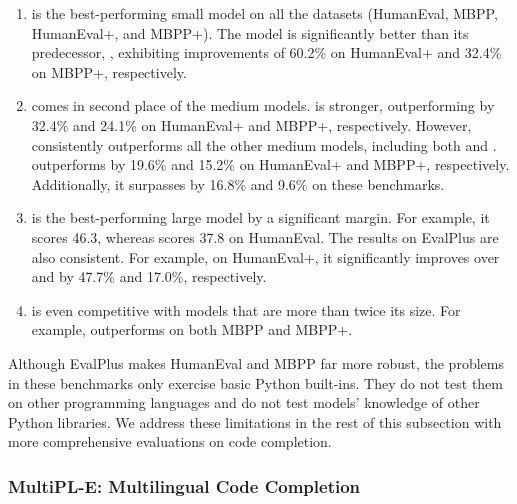 \documentclass[10pt]{article} %
\newcommand{\remove}[1]{}
\begin{document}
\begin{enumerate}
\item {} is the best-performing small model on all the datasets (HumanEval, MBPP, HumanEval+, and MBPP+). The model is significantly better than its predecessor, , exhibiting improvements of 60.2\% on HumanEval+ and 32.4\% on MBPP+, respectively.

\item {} comes in second place of the medium models.  is stronger, outperforming  by 32.4\% and 24.1\% on HumanEval+ and MBPP+, respectively. However,  consistently outperforms all the other medium models, including both  and .  outperforms  by 19.6\% and 15.2\% on HumanEval+ and MBPP+, respectively. Additionally, it surpasses  by 16.8\% and 9.6\% on these benchmarks.

\item {} is the best-performing large model by a significant margin. For example, it scores 46.3, whereas  scores 37.8 on HumanEval. The results on EvalPlus are also consistent. For example, on HumanEval+, it significantly improves over  and  by 47.7\% and 17.0\%, respectively.

\item {} is even competitive with models that are more than twice its size. For example,  outperforms  on both MBPP and MBPP+.    
\end{enumerate}


Although EvalPlus makes HumanEval and MBPP far more robust, the problems in these benchmarks only exercise basic Python built-ins. They do not test them on other programming languages and do not test models' knowledge of other Python libraries.\remove{ Finally, these benchmarks only evaluate models on the natural-language-based code generation tasks, even though one can use these models in various ways.} We address these limitations in the rest of this subsection with more comprehensive evaluations on code completion.


\subsubsection{MultiPL-E:\remove{HumanEval Translated to 18 Other Programming Languages} Multilingual Code Completion}
\label{subsubsec:multiple}
\end{document}
